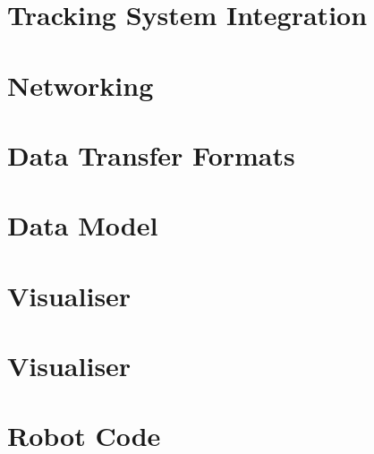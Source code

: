 
\section{Tracking System Integration} \label{TrackingSystemIntegration}



\section{Networking}



\section{Data Transfer Formats}



\section{Data Model}



\section{Visualiser}



\section{Visualiser}



\section{Robot Code}


